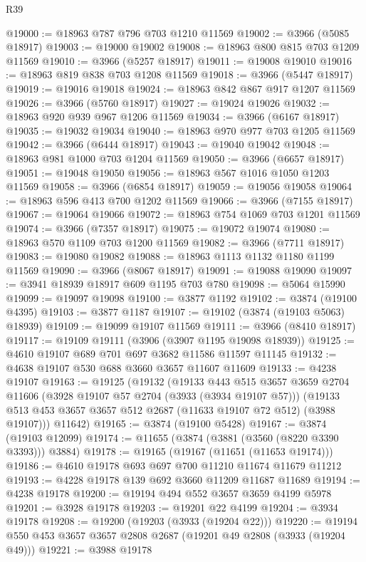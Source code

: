 \begin{lexlean}{R39}
\begin{coremodule}
@19000 := @18963 @787 @796 @703 @1210 @11569
@19002 := @3966 (@5085 @18917)
@19003 := @19000 @19002
@19008 := @18963 @800 @815 @703 @1209 @11569
@19010 := @3966 (@5257 @18917)
@19011 := @19008 @19010
@19016 := @18963 @819 @838 @703 @1208 @11569
@19018 := @3966 (@5447 @18917)
@19019 := @19016 @19018
@19024 := @18963 @842 @867 @917 @1207 @11569
@19026 := @3966 (@5760 @18917)
@19027 := @19024 @19026
@19032 := @18963 @920 @939 @967 @1206 @11569
@19034 := @3966 (@6167 @18917)
@19035 := @19032 @19034
@19040 := @18963 @970 @977 @703 @1205 @11569
@19042 := @3966 (@6444 @18917)
@19043 := @19040 @19042
@19048 := @18963 @981 @1000 @703 @1204 @11569
@19050 := @3966 (@6657 @18917)
@19051 := @19048 @19050
@19056 := @18963 @567 @1016 @1050 @1203 @11569
@19058 := @3966 (@6854 @18917)
@19059 := @19056 @19058
@19064 := @18963 @596 @413 @700 @1202 @11569
@19066 := @3966 (@7155 @18917)
@19067 := @19064 @19066
@19072 := @18963 @754 @1069 @703 @1201 @11569
@19074 := @3966 (@7357 @18917)
@19075 := @19072 @19074
@19080 := @18963 @570 @1109 @703 @1200 @11569
@19082 := @3966 (@7711 @18917)
@19083 := @19080 @19082
@19088 := @18963 @1113 @1132 @1180 @1199 @11569
@19090 := @3966 (@8067 @18917)
@19091 := @19088 @19090
@19097 := @3941 @18939 @18917 @609 @1195 @703 @780
@19098 := @5064 @15990
@19099 := @19097 @19098
@19100 := @3877 @1192
@19102 := @3874 (@19100 @4395)
@19103 := @3877 @1187
@19107 := @19102 (@3874 (@19103 @5063) @18939)
@19109 := @19099 @19107 @11569
@19111 := @3966 (@8410 @18917)
@19117 := @19109 @19111 (@3906 (@3907 @1195 @19098 @18939))
@19125 := @4610 @19107 @689 @701 @697 @3682 @11586 @11597 @11145
@19132 := @4638 @19107 @530 @688 @3660 @3657 @11607 @11609
@19133 := @4238 @19107
@19163 := @19125
    (@19132
      (@19133
        @443
        @515
        @3657
        @3659
        @2704
        @11606
        (@3928 @19107 @57 @2704 (@3933 (@3934 @19107 @57)))
        (@19133 @513 @453 @3657 @3657 @512 @2687 (@11633 @19107 @72 @512) (@3988 @19107)))
      @11642)
@19165 := @3874 (@19100 @5428)
@19167 := @3874 (@19103 @12099)
@19174 := @11655 (@3874 (@3881 (@3560 (@8220 @3390 @3393))) @3884)
@19178 := @19165 (@19167 (@11651 (@11653 @19174)))
@19186 := @4610 @19178 @693 @697 @700 @11210 @11674 @11679 @11212
@19193 := @4228 @19178 @139 @692 @3660 @11209 @11687 @11689
@19194 := @4238 @19178
@19200 := @19194 @494 @552 @3657 @3659 @4199 @5978
@19201 := @3928 @19178
@19203 := @19201 @22 @4199
@19204 := @3934 @19178
@19208 := @19200 (@19203 (@3933 (@19204 @22)))
@19220 := @19194 @550 @453 @3657 @3657 @2808 @2687 (@19201 @49 @2808 (@3933 (@19204 @49)))
@19221 := @3988 @19178

\end{coremodule}
\end{lexlean}
